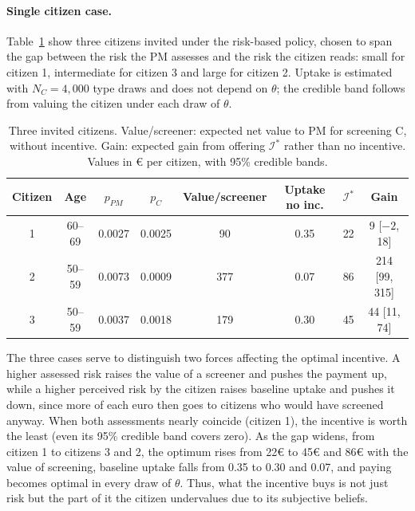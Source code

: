 \documentclass[12pt]{article}
\begin{document}
\paragraph{Single citizen case.} Table~\ref{tab:patients} show three citizens invited under the risk-based policy, chosen to span the gap between the risk the PM assesses and the risk the citizen reads: small for citizen 1, intermediate for citizen 3 and large for citizen 2. Uptake is estimated with $N_C = 4{,}000$ type draws and does not depend on $\theta$; the credible band follows from valuing the citizen under each draw of $\theta$.
\begin{table}[h!]
\centering
\footnotesize
\caption{Three invited citizens. Value/screener: expected net value to PM for screening C, without incentive. Gain: expected gain from offering $\mathcal{I}^*$ rather than no incentive. Values in € per citizen, with 95\% credible bands.}
\label{tab:patients}
\begin{tabular}{c c c c c c c c}
\toprule
\textbf{Citizen} & \textbf{Age} & $p_{PM}$ & $p_C$ & \textbf{Value/screener} & \textbf{Uptake no inc.} & $\mathcal{I}^*$ & \textbf{Gain} \\
\midrule
1 & 60--69 & 0.0027 & 0.0025 &  90 & 0.35 & 22 & 9 [$-2$, 18] \\
2 & 50--59     & 0.0073 & 0.0009 & 377 & 0.07 & 86 & 214 [99, 315] \\
3 & 50--59 & 0.0037 & 0.0018 & 179 & 0.30 & 45 & 44 [11, 74] \\
\bottomrule
\end{tabular}
\end{table}
The three cases serve to distinguish two forces affecting the optimal incentive. A higher assessed risk raises the value of a screener and pushes the payment up, while a higher perceived risk by the citizen raises baseline uptake and pushes it down, since more of each euro then goes to citizens who would have screened anyway. When both assessments nearly coincide (citizen 1), the incentive is worth the least (even its 95\% credible band covers zero). As the gap widens, from citizen 1 to citizens 3 and 2, the optimum rises from 22€ to 45€ and 86€ with the value of screening, baseline uptake falls from 0.35 to 0.30 and 0.07, and paying becomes optimal in every draw of $\theta$. Thus, what the incentive buys is not just risk but the part of it the citizen undervalues due to its subjective beliefs.



\end{document}
